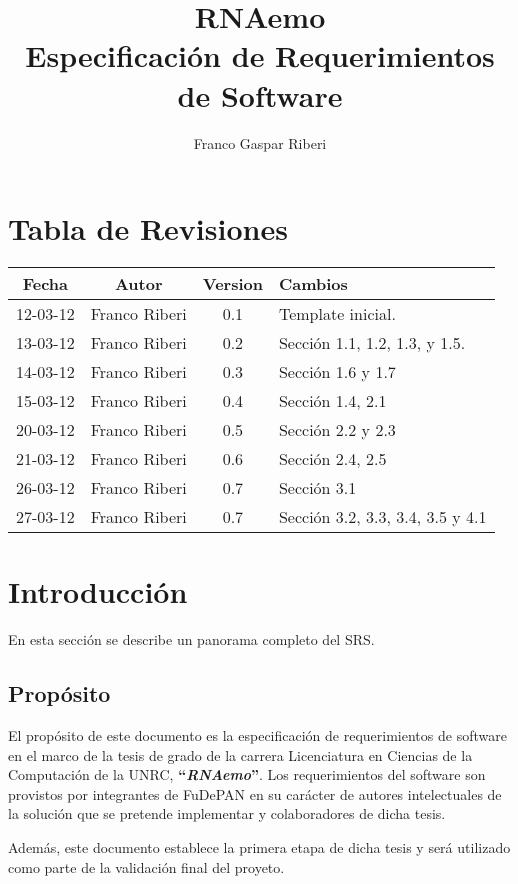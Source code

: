 \documentclass[12pt,a4paper,english,spanish]{article}
\title{\textbf{RNAemo}\\ \vspace{0.45cm} Especificación de Requerimientos de Software} %
\author{Franco Gaspar Riberi}
\newcommand{\rnaemo}{\textbf{\emph{RNAemo}}}
\begin{document}
\maketitle\pagebreak{}\tableofcontents{}\pagebreak{}

\section*{Tabla de Revisiones}
	
\begin{center}
\begin{tabular}{| c | c | c | l |}
	\hline
	{\bf Fecha} & {\bf Autor} & {\bf Version} & {\bf Cambios}\\
	\hline
	\hline		
	12-03-12 & Franco Riberi & 0.1 & Template inicial.\\\hline
	13-03-12 & Franco Riberi & 0.2 & Sección 1.1, 1.2, 1.3,  y 1.5.\\\hline
	14-03-12 & Franco Riberi & 0.3 & Sección 1.6 y 1.7\\\hline
	15-03-12 & Franco Riberi & 0.4 & Sección 1.4, 2.1 \\\hline
	20-03-12 & Franco Riberi & 0.5 & Sección 2.2 y 2.3 \\\hline
	21-03-12 & Franco Riberi & 0.6 & Sección 2.4, 2.5 \\\hline
	26-03-12 & Franco Riberi & 0.7 & Sección 3.1 \\\hline
	27-03-12 & Franco Riberi & 0.7 & Sección 3.2, 3.3, 3.4, 3.5 y 4.1 \\\hline
\end{tabular}
\end{center}
\newpage

\section{Introducción}
En esta sección se describe un panorama completo del SRS.

\subsection{Propósito}
\par El propósito de este documento es la especificación de requerimientos
de software en el marco de la tesis de grado de la carrera Licenciatura en
Ciencias de la Computación de la UNRC, \textbf{``}\rnaemo\textbf{''}.  Los requerimientos 
del software son provistos por integrantes de FuDePAN en su carácter de autores
intelectuales de la solución que se pretende implementar y colaboradores
de dicha tesis.
\par Además, este documento establece la primera etapa de dicha tesis y será utilizado
como parte de la validación final del proyeto.
\end{document}
